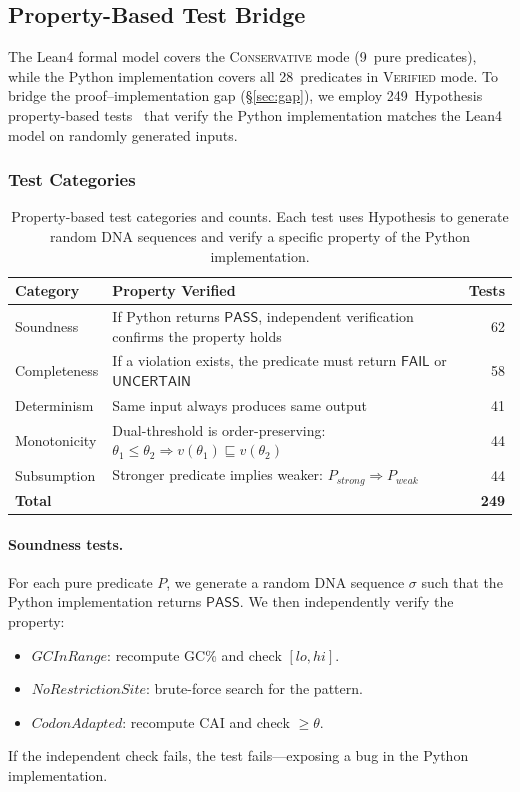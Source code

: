 \documentclass[acmsmall,review,anonymous]{acmart}
\newcommand{\PASS}{\ensuremath{\mathsf{PASS}}\xspace}
\newcommand{\FAIL}{\ensuremath{\mathsf{FAIL}}\xspace}
\newcommand{\UNCERTAIN}{\ensuremath{\mathsf{UNCERTAIN}}\xspace}
\newcommand{\seq}{\sigma}
\newcommand{\pred}{P}
\newcommand{\verdict}{v}
\newcommand{\CONSERVATIVE}{\textsc{Conservative}\xspace}
\newcommand{\VERIFIED}{\textsc{Verified}\xspace}
\begin{document}
\subsection{Property-Based Test Bridge}\label{sec:pbt}

The Lean4 formal model covers the \CONSERVATIVE{} mode (9~pure
predicates), while the Python implementation covers all 28~predicates
in \VERIFIED{} mode.
To bridge the proof--implementation gap (\S\ref{sec:gap}), we employ
249~Hypothesis property-based tests~\cite{maciver2019hypothesis}
that verify the Python implementation matches the Lean4 model on
randomly generated inputs.

\subsubsection{Test Categories}

\begin{table}[t]
\centering
\caption{Property-based test categories and counts. Each test uses
         Hypothesis to generate random DNA sequences and verify a
         specific property of the Python implementation.}
\label{tab:pbt}
\begin{tabular}{lp{6.5cm}r}
\toprule
\textbf{Category} & \textbf{Property Verified} & \textbf{Tests} \\
\midrule
Soundness &
  If Python returns \PASS{}, independent verification confirms
  the property holds & 62 \\
Completeness &
  If a violation exists, the predicate must return \FAIL{} or
  \UNCERTAIN{} & 58 \\
Determinism &
  Same input always produces same output & 41 \\
Monotonicity &
  Dual-threshold is order-preserving:
  $\theta_1 \le \theta_2 \Rightarrow
   \verdict(\theta_1) \sqsubseteq \verdict(\theta_2)$ & 44 \\
Subsumption &
  Stronger predicate implies weaker:
  $\pred_{\mathit{strong}} \Rightarrow \pred_{\mathit{weak}}$
  & 44 \\
\midrule
\textbf{Total} & & \textbf{249} \\
\bottomrule
\end{tabular}
\end{table}

\paragraph{Soundness tests.}
For each pure predicate $\pred$, we generate a random DNA sequence
$\seq$ such that the Python implementation returns \PASS.
We then independently verify the property:
\begin{itemize}[leftmargin=*,itemsep=0pt,topsep=1pt]
\item $\mathit{GCInRange}$: recompute GC\% and check $[lo, hi]$.
\item $\mathit{NoRestrictionSite}$: brute-force search for the
      pattern.
\item $\mathit{CodonAdapted}$: recompute CAI and check $\ge \theta$.
\end{itemize}
If the independent check fails, the test fails---exposing a bug in the
Python implementation.
\end{document}
